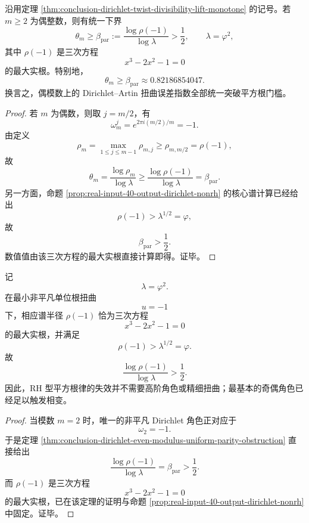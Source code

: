 \begin{theorem}[偶模数上的平方根律统一失效]\label{thm:conclusion-dirichlet-even-modulus-uniform-parity-obstruction}
沿用定理 \ref{thm:conclusion-dirichlet-twist-divisibility-lift-monotone} 的记号。若 \(m\ge 2\) 为偶整数，则有统一下界
\[
\theta_m\ge \beta_{\mathrm{par}}
:=
\frac{\log \rho(-1)}{\log\lambda}
>
\frac12,
\qquad
\lambda=\varphi^2,
\]
其中 \(\rho(-1)\) 是三次方程
\[
x^3-2x^2-1=0
\]
的最大实根。特别地，
\[
\theta_m\ge \beta_{\mathrm{par}}\approx 0.82186854047.
\]
换言之，偶模数上的 Dirichlet--Artin 扭曲误差指数全部统一突破平方根门槛。
\end{theorem}
\begin{proof}
若 \(m\) 为偶数，则取 \(j=m/2\)，有
\[
\omega_m^j=e^{2\pi i(m/2)/m}=-1.
\]
由定义
\[
\rho_m=\max_{1\le j\le m-1}\rho_{m,j}\ge \rho_{m,m/2}=\rho(-1),
\]
故
\[
\theta_m=\frac{\log \rho_m}{\log\lambda}\ge \frac{\log \rho(-1)}{\log\lambda}=\beta_{\mathrm{par}}.
\]
另一方面，命题 \ref{prop:real-input-40-output-dirichlet-nonrh} 的核心谱计算已经给出
\[
\rho(-1)>\lambda^{1/2}=\varphi,
\]
故
\[
\beta_{\mathrm{par}}>\frac12.
\]
数值值由该三次方程的最大实根直接计算即得。证毕。
\end{proof}

\begin{corollary}[最小非平凡角色已足以触发平方根律失效]\label{cor:conclusion-dirichlet-minimal-character-trigger}
记
\[
\lambda=\varphi^2.
\]
在最小非平凡单位根扭曲
\[
u=-1
\]
下，相应谱半径 \(\rho(-1)\) 恰为三次方程
\[
x^3-2x^2-1=0
\]
的最大实根，并满足
\[
\rho(-1)>\lambda^{1/2}=\varphi.
\]
故
\[
\frac{\log \rho(-1)}{\log \lambda}>\frac12.
\]
因此，RH 型平方根律的失效并不需要高阶角色或精细扭曲；最基本的奇偶角色已经足以触发相变。
\end{corollary}
\begin{proof}
当模数 \(m=2\) 时，唯一的非平凡 Dirichlet 角色正对应于
\[
\omega_2=-1.
\]
于是定理 \ref{thm:conclusion-dirichlet-even-modulus-uniform-parity-obstruction} 直接给出
\[
\frac{\log \rho(-1)}{\log \lambda}
=
\beta_{\mathrm{par}}
>
\frac12.
\]
而 \(\rho(-1)\) 是三次方程
\[
x^3-2x^2-1=0
\]
的最大实根，已在该定理的证明与命题 \ref{prop:real-input-40-output-dirichlet-nonrh} 中固定。证毕。
\end{proof}

